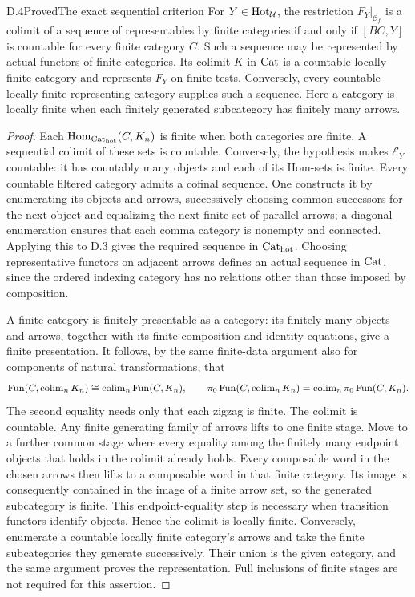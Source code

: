\begin{claim}{D.4}{Proved}{The exact sequential criterion}
For $Y\in\mathrm{Hot}_\mathcal U$, the restriction $F_Y|_{\mathcal C_f}$ is a colimit of a sequence of representables by finite categories if and only if $[BC,Y]$ is countable for every finite category $C$. Such a sequence may be represented by actual functors of finite categories. Its colimit $K$ in $\mathrm{Cat}$ is a countable locally finite category and represents $F_Y$ on finite tests. Conversely, every countable locally finite representing category supplies such a sequence. Here a category is locally finite when each finitely generated subcategory has finitely many arrows.
\end{claim}
\begin{proof}
Each $\operatorname{Hom}_{{\mathrm{Cat}_{\mathrm{hot}}}}(C,K_n)$ is finite when both categories are finite. A sequential colimit of these sets is countable. Conversely, the hypothesis makes $\mathcal E_Y$ countable: it has countably many objects and each of its Hom-sets is finite. Every countable filtered category admits a cofinal sequence. One constructs it by enumerating its objects and arrows, successively choosing common successors for the next object and equalizing the next finite set of parallel arrows; a diagonal enumeration ensures that each comma category is nonempty and connected. Applying this to D.3 gives the required sequence in ${\mathrm{Cat}_{\mathrm{hot}}}$. Choosing representative functors on adjacent arrows defines an actual sequence in $\mathrm{Cat}$, since the ordered indexing category has no relations other than those imposed by composition.

A finite category is finitely presentable as a category: its finitely many objects and arrows, together with its finite composition and identity equations, give a finite presentation. It follows, by the same finite-data argument also for components of natural transformations, that
\[
 \operatorname{Fun}(C,\operatorname{colim}_nK_n)\cong\operatorname{colim}_n\operatorname{Fun}(C,K_n),\qquad
 \pi_0\operatorname{Fun}(C,\operatorname{colim}_nK_n)=\operatorname{colim}_n\pi_0\operatorname{Fun}(C,K_n).
\]
The second equality needs only that each zigzag is finite. The colimit is countable. Any finite generating family of arrows lifts to one finite stage. Move to a further common stage where every equality among the finitely many endpoint objects that holds in the colimit already holds. Every composable word in the chosen arrows then lifts to a composable word in that finite category. Its image is consequently contained in the image of a finite arrow set, so the generated subcategory is finite. This endpoint-equality step is necessary when transition functors identify objects. Hence the colimit is locally finite. Conversely, enumerate a countable locally finite category's arrows and take the finite subcategories they generate successively. Their union is the given category, and the same argument proves the representation. Full inclusions of finite stages are not required for this assertion.
\end{proof}

